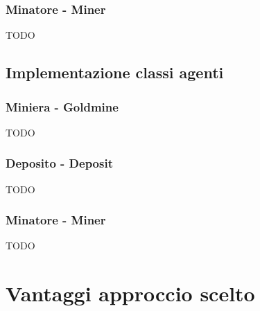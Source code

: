 \subsubsection{Minatore - Miner}
TODO

\subsection{Implementazione classi agenti}

\subsubsection{Miniera - Goldmine}
TODO

\subsubsection{Deposito - Deposit}
TODO

\subsubsection{Minatore - Miner}
TODO









\section{Vantaggi approccio scelto}
